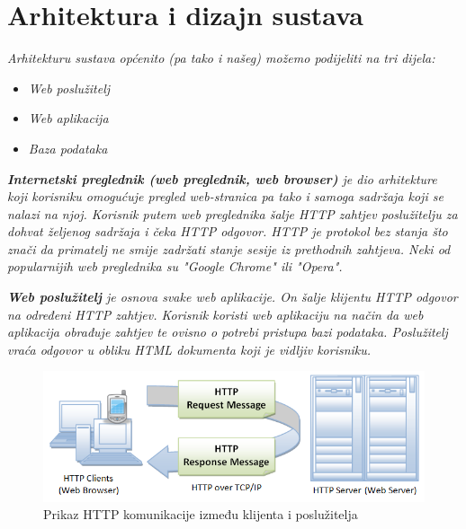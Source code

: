 \chapter{Arhitektura i dizajn sustava}

		\textit{Arhitekturu sustava općenito (pa tako i našeg) možemo podijeliti na tri dijela:}
	\begin{itemize}
		\item 	\textit{Web poslužitelj}
		\item 	\textit{Web aplikacija}
		\item 	\textit{Baza podataka}		
	\end{itemize}
	
	\textit{\textbf{Internetski preglednik (web preglednik, web browser)} je dio arhitekture koji korisniku omogućuje pregled web-stranica pa tako i samoga sadržaja koji se nalazi na njoj. Korisnik putem web preglednika šalje HTTP zahtjev poslužitelju za dohvat željenog sadržaja i čeka HTTP odgovor. HTTP je protokol bez stanja što znači da primatelj ne smije zadržati stanje sesije iz prethodnih zahtjeva. Neki od popularnijih web preglednika su "Google Chrome" ili "Opera".}
	
	\textit{\textbf{Web poslužitelj} je osnova svake web aplikacije. On šalje klijentu HTTP odgovor na određeni HTTP zahtjev. Korisnik koristi web aplikaciju na način da web aplikacija obrađuje zahtjev te ovisno o potrebi pristupa bazi podataka. Poslužitelj vraća odgovor u obliku HTML dokumenta koji je vidljiv korisniku.}
		
    \begin{figure}[H]
    	\includegraphics[scale=1.2]{slike/HTTP.PNG} %
    	\centering
    	\caption{Prikaz HTTP komunikacije između klijenta i poslužitelja}
    	\label{fig:promjene}
    \end{figure}
    
    \textit{\newline \newline}
    
